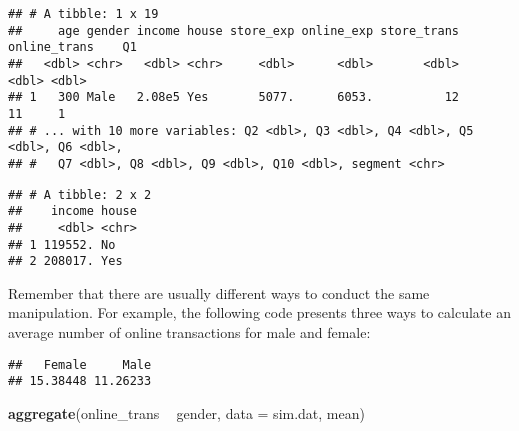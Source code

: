 \documentclass[
]{article}
\newenvironment{Shaded}{\begin{snugshade}}{\end{snugshade}}
\newcommand{\CommentTok}[1]{\textcolor[rgb]{0.56,0.35,0.01}{\textit{#1}}}
\newcommand{\DataTypeTok}[1]{\textcolor[rgb]{0.13,0.29,0.53}{#1}}
\newcommand{\DecValTok}[1]{\textcolor[rgb]{0.00,0.00,0.81}{#1}}
\newcommand{\KeywordTok}[1]{\textcolor[rgb]{0.13,0.29,0.53}{\textbf{#1}}}
\newcommand{\NormalTok}[1]{#1}
\newcommand{\OperatorTok}[1]{\textcolor[rgb]{0.81,0.36,0.00}{\textbf{#1}}}
\newcommand{\StringTok}[1]{\textcolor[rgb]{0.31,0.60,0.02}{#1}}
\begin{document}
\begin{verbatim}
## # A tibble: 1 x 19
##     age gender income house store_exp online_exp store_trans online_trans    Q1
##   <dbl> <chr>   <dbl> <chr>     <dbl>      <dbl>       <dbl>        <dbl> <dbl>
## 1   300 Male   2.08e5 Yes       5077.      6053.          12           11     1
## # ... with 10 more variables: Q2 <dbl>, Q3 <dbl>, Q4 <dbl>, Q5 <dbl>, Q6 <dbl>,
## #   Q7 <dbl>, Q8 <dbl>, Q9 <dbl>, Q10 <dbl>, segment <chr>
\end{verbatim}

\begin{Shaded}
\end{Shaded}

\begin{verbatim}
## # A tibble: 2 x 2
##    income house
##     <dbl> <chr>
## 1 119552. No   
## 2 208017. Yes
\end{verbatim}

Remember that there are usually different ways to conduct the same
manipulation. For example, the following code presents three ways to
calculate an average number of online transactions for male and female:

\begin{Shaded}
\end{Shaded}

\begin{verbatim}
##   Female     Male 
## 15.38448 11.26233
\end{verbatim}

\begin{Shaded}
\begin{Highlighting}[]
\KeywordTok{aggregate}\NormalTok{(online_trans }\OperatorTok{~}\StringTok{ }\NormalTok{gender, }\DataTypeTok{data =}\NormalTok{ sim.dat, mean)}
\end{Highlighting}
\end{Shaded}
\end{document}
